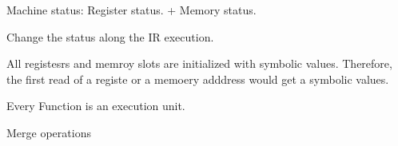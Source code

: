 Machine status: Register status. + Memory status.

Change the status along the IR execution.

All registesrs and memroy slots are initialized with symbolic values.
Therefore, the first read of a registe or a memoery adddress would get a symbolic values.

Every Function is an execution unit.

Merge operations


